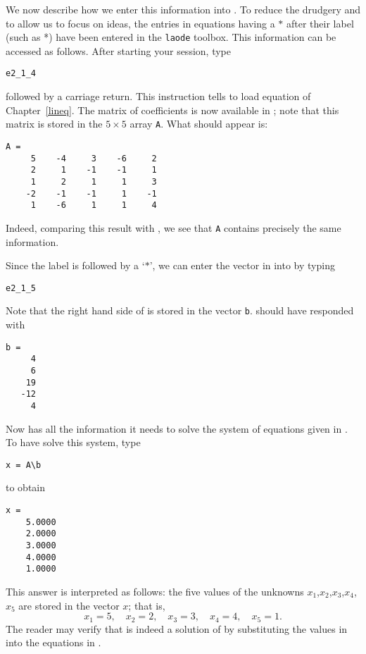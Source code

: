 We now describe how we enter this information into \Matlabp.  To
reduce the drudgery and to allow us to focus on ideas, the entries
in equations having a $*$ after their label
(such as *) have been entered in the {\tt laode}
toolbox. This information can be accessed as follows.  After
starting your \Matlab session, type
\begin{verbatim}
e2_1_4
\end{verbatim}
followed by a carriage return.  This instruction tells \Matlab to
load equation  of Chapter~\ref{lineq}.  The matrix of
coefficients is now available in \Matlabp; note that this matrix is
stored in the $5\times 5$ array {\tt A}.  What should appear is:
\begin{verbatim}
A =
     5    -4     3    -6     2
     2     1    -1    -1     1
     1     2     1     1     3
    -2    -1    -1     1    -1
     1    -6     1     1     4
\end{verbatim}
Indeed, comparing this result with , we see that
{\tt A} contains precisely the same information.

Since the label  is followed by a `$*$', we can enter
the vector in  into \Matlab by typing
\begin{verbatim}
e2_1_5
\end{verbatim}
Note that the right hand side of  is stored in the vector {\tt b}.
\Matlab should have responded with
\begin{verbatim}
b =
     4
     6
    19
   -12
     4
\end{verbatim}
Now \Matlab has all the information it needs to solve the system
of equations given in .  To have \Matlab solve this
system, type
\begin{verbatim}
x = A\b
\end{verbatim}
\index{\computer!$\backslash$}to obtain
\begin{verbatim}
x =
    5.0000
    2.0000
    3.0000
    4.0000
    1.0000
\end{verbatim}
This answer is interpreted as follows: the five values of the
unknowns $x_1$,$x_2$,$x_3$,$x_4$,$x_5$ are stored in the vector
$x$; that is,
\begin{equation} \label{answer1}
 x_1 = 5,\quad x_2 = 2,\quad x_3 = 3,\quad x_4 = 4,\quad x_5 = 1.
\end{equation}
The reader may verify that  is indeed a solution of
 by substituting the values in  into the
equations in .

